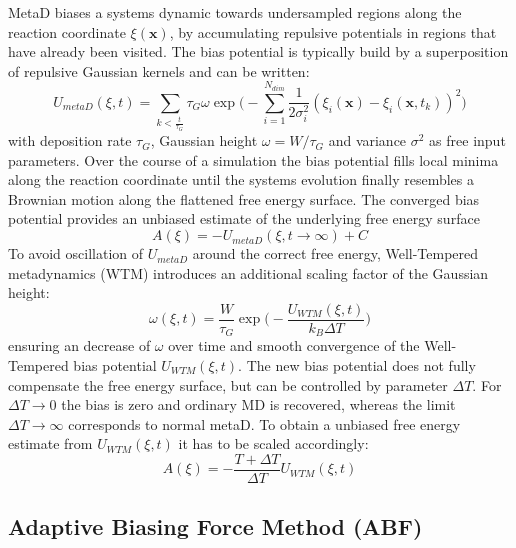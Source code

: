 MetaD biases a systems dynamic towards undersampled regions along the reaction coordinate $\xi(\textbf{x})$, by accumulating repulsive potentials in regions that have already been visited. The bias potential is typically build by a superposition of repulsive Gaussian kernels and can be written:\autocite{barducci2011metadynamics}
\begin{equation}
  U_{metaD}(\xi,t)= \sum_{k<\frac{t}{\tau_G}} \tau_G \omega \exp\biggr(-\sum_{i=1}^{N_{dim}} \frac{1}{2\sigma_{i}^{2}} (\xi_{i}(\textbf{x})-\xi_{i}(\textbf{x},t_k))^2 \biggl)
\end{equation}
with deposition rate $\tau_G$, Gaussian height $\omega=W/\tau_G$ and variance $\sigma^2$ as free input parameters. Over the course of a simulation the bias potential fills local minima along the reaction coordinate until the systems evolution finally resembles a Brownian motion along the flattened free energy surface. The converged bias potential provides an unbiased estimate of the underlying free energy surface
\begin{equation}
  A(\xi) = -U_{metaD}(\xi, t \to \infty) + C
\end{equation}
To avoid oscillation of $U_{metaD}$ around the correct free energy, Well-Tempered metadynamics (WTM) introduces an additional scaling factor of the Gaussian height:\autocite{barducci2008well}
\begin{equation}
  \omega(\xi,t) = \frac{W}{\tau_G}\exp\biggl(-\frac{U_{WTM}(\xi,t)}{k_B \Delta T} \biggr)
\end{equation}
ensuring an decrease of $\omega$ over time and smooth convergence of the Well-Tempered bias potential $U_{WTM}(\xi,t)$. The new bias potential does not fully compensate the free energy surface, but can be controlled by parameter $\Delta T$. For $\Delta T \to 0$ the bias is zero and ordinary MD is recovered, whereas the limit $\Delta T \to \infty$ corresponds to normal metaD. To obtain a unbiased free energy estimate from $U_{WTM}(\xi,t)$ it has to be scaled accordingly:
\begin{equation}
A(\xi) = -\frac{T+\Delta T}{\Delta T}U_{WTM}(\xi, t)
\end{equation}

\newpage
\subsection{Adaptive Biasing Force Method (ABF)}
\label{sec:ABF}

